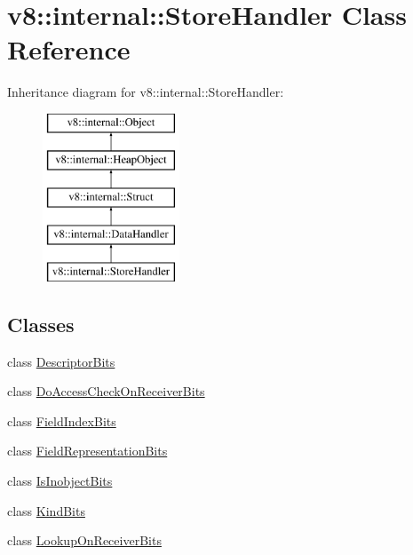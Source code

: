 \hypertarget{classv8_1_1internal_1_1StoreHandler}{}\section{v8\+:\+:internal\+:\+:Store\+Handler Class Reference}
\label{classv8_1_1internal_1_1StoreHandler}
Inheritance diagram for v8\+:\+:internal\+:\+:Store\+Handler\+:\begin{figure}[H]
\begin{center}
\leavevmode
\includegraphics[height=5.000000cm]{classv8_1_1internal_1_1StoreHandler}
\end{center}
\end{figure}
\subsection*{Classes}
\begin{DoxyCompactItemize}
\item 
class \mbox{\hyperlink{classv8_1_1internal_1_1StoreHandler_1_1DescriptorBits}{Descriptor\+Bits}}
\item 
class \mbox{\hyperlink{classv8_1_1internal_1_1StoreHandler_1_1DoAccessCheckOnReceiverBits}{Do\+Access\+Check\+On\+Receiver\+Bits}}
\item 
class \mbox{\hyperlink{classv8_1_1internal_1_1StoreHandler_1_1FieldIndexBits}{Field\+Index\+Bits}}
\item 
class \mbox{\hyperlink{classv8_1_1internal_1_1StoreHandler_1_1FieldRepresentationBits}{Field\+Representation\+Bits}}
\item 
class \mbox{\hyperlink{classv8_1_1internal_1_1StoreHandler_1_1IsInobjectBits}{Is\+Inobject\+Bits}}
\item 
class \mbox{\hyperlink{classv8_1_1internal_1_1StoreHandler_1_1KindBits}{Kind\+Bits}}
\item 
class \mbox{\hyperlink{classv8_1_1internal_1_1StoreHandler_1_1LookupOnReceiverBits}{Lookup\+On\+Receiver\+Bits}}
\end{DoxyCompactItemize}
